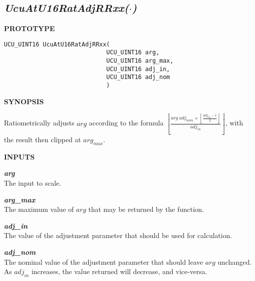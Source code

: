 \subsection[\emph{UcuAtU16RatAdjRRxx(\protect\mbox{\protect$\cdot$})}]
           {\emph{UcuAtU16RatAdjRRxx(\protect\mbox{\protect\boldmath $\cdot$})}}
\label{cafn0:sraf0:srat0}

%

\noindent\textbf{PROTOTYPE}
\begin {list}{}{\setlength{\leftmargin}{0.25in}\setlength{\topsep}{0.0in}}
\item
\begin{verbatim}
UCU_UINT16 UcuAtU16RatAdjRRxx(
                             UCU_UINT16 arg, 
                             UCU_UINT16 arg_max, 
                             UCU_UINT16 adj_in, 
                             UCU_UINT16 adj_nom
                             )
\end{verbatim}
\end{list}
\vspace{2.8ex}

\noindent\textbf{SYNOPSIS}
\begin{list}{}{\setlength{\leftmargin}{0.25in}\setlength{\topsep}{0.0in}}
\item Ratiometrically adjusts $arg$ according to the formula
      $\displaystyle{\left\lfloor \frac{arg\;adj_{nom} + \left\lfloor \displaystyle{\frac{adj_{in} - 1}{2}} \right\rfloor}{adj_{in}} \right\rfloor}$,
      with the result then clipped at $arg_{max}$.
\end{list}
\vspace{2.8ex}

\noindent\textbf{INPUTS}
\begin{list}{}{\setlength{\leftmargin}{0.5in}\setlength{\itemindent}{-0.25in}\setlength{\topsep}{0.0in}\setlength{\partopsep}{0.0in}}
\item \emph{\textbf{arg}}\\
      The input to scale.
\item \emph{\textbf{arg\_max}}\\
      The maximum value of $arg$ that may be returned by the function.
\item \emph{\textbf{adj\_in}}\\
      The value of the adjustment parameter that should be used for calculation.
\item \emph{\textbf{adj\_nom}}\\
      The nominal value of the adjustment parameter that should leave $arg$ unchanged.  As
      $adj_{in}$ increases, the value returned will decrease, and vice-versa.
\end{list}
\vspace{2.8ex}

